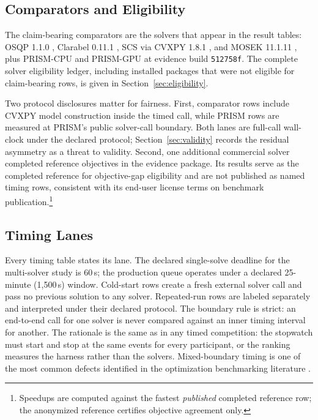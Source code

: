 \documentclass[10pt,a4paper]{extarticle}
\begin{document}
\subsection{Comparators and Eligibility}

The claim-bearing comparators are the solvers that appear in the result
tables: OSQP 1.1.0 \citep{osqp}, Clarabel 0.11.1 \citep{clarabel2024}, SCS
\citep{scs2016} via CVXPY 1.8.1 \citep{cvxpy2016}, and MOSEK 11.1.11
\citep{mosek2026}, plus PRISM-CPU and PRISM-GPU at evidence build
\texttt{512758f}. The complete solver eligibility ledger, including installed
packages that were not eligible for claim-bearing rows, is given in
Section~\ref{sec:eligibility}.

Two protocol disclosures matter for fairness. First, comparator rows include
CVXPY model construction inside the timed call, while PRISM rows are measured
at PRISM's public solver-call boundary. Both lanes are full-call wall-clock
under the declared protocol; Section~\ref{sec:validity} records the residual
asymmetry as a threat to validity. Second, one additional commercial solver
completed reference objectives in the evidence package. Its results serve as
the completed reference for objective-gap eligibility and are not published as
named timing rows, consistent with its end-user license terms on benchmark
publication.\footnote{Speedups are computed against the fastest
\emph{published} completed reference row; the anonymized reference certifies
objective agreement only.}

\subsection{Timing Lanes}

Every timing table states its lane. The declared single-solve deadline for the
multi-solver study is 60\,s; the production queue operates under a declared
25-minute (1{,}500\,s) window. Cold-start rows create a fresh external solver
call and pass no previous solution to any solver. Repeated-run rows are labeled
separately and interpreted under their declared protocol. The boundary rule is
strict: an end-to-end call for one solver is never compared against an inner
timing interval for another. The rationale is the same as in any timed
competition: the stopwatch must start and stop at the same events for every
participant, or the ranking measures the harness rather than the solvers.
Mixed-boundary timing is one of the most common defects identified in the
optimization benchmarking literature \citep{bartz2020benchmarking}.
\end{document}
